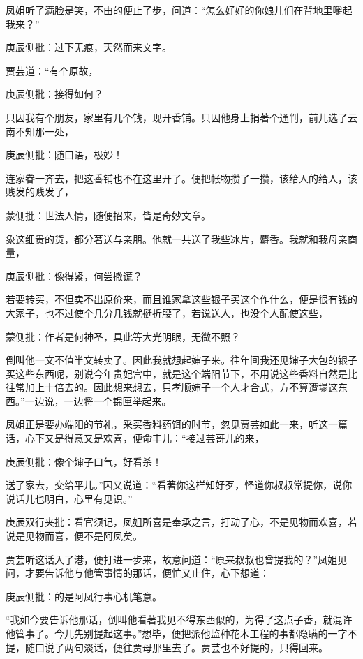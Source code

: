 \begin{parag}


    凤姐听了满脸是笑，不由的便止了步，问道：“怎么好好的你娘儿们在背地里嚼起我来？”\begin{note}庚辰侧批：过下无痕，天然而来文字。\end{note}贾芸道：“有个原故，\begin{note}庚辰侧批：接得如何？\end{note}只因我有个朋友，家里有几个钱，现开香铺。只因他身上捐著个通判，前儿选了云南不知那一处，\begin{note}庚辰侧批：随口语，极妙！\end{note}连家眷一齐去，把这香铺也不在这里开了。便把帐物攒了一攒，该给人的给人，该贱发的贱发了，\begin{note}蒙侧批：世法人情，随便招来，皆是奇妙文章。\end{note}象这细贵的货，都分著送与亲朋。他就一共送了我些冰片，麝香。我就和我母亲商量，\begin{note}庚辰侧批：像得紧，何尝撒谎？\end{note}若要转买，不但卖不出原价来，而且谁家拿这些银子买这个作什么，便是很有钱的大家子，也不过使个几分几钱就挺折腰了，若说送人，也没个人配使这些，\begin{note}蒙侧批：作者是何神圣，具此等大光明眼，无微不照？\end{note}倒叫他一文不值半文转卖了。因此我就想起婶子来。往年间我还见婶子大包的银子买这些东西呢，别说今年贵妃宫中，就是这个端阳节下，不用说这些香料自然是比往常加上十倍去的。因此想来想去，只孝顺婶子一个人才合式，方不算遭塌这东西。”一边说，一边将一个锦匣举起来。
\end{parag}


\begin{parag}


    凤姐正是要办端阳的节礼，采买香料药饵的时节，忽见贾芸如此一来，听这一篇话，心下又是得意又是欢喜，便命丰儿：“接过芸哥儿的来，\begin{note}庚辰侧批：像个婶子口气，好看杀！\end{note}送了家去，交给平儿。”因又说道：“看著你这样知好歹，怪道你叔叔常提你，说你说话儿也明白，心里有见识。”\begin{note}庚辰双行夹批：看官须记，凤姐所喜是奉承之言，打动了心，不是见物而欢喜，若说是见物而喜，便不是阿凤矣。\end{note}贾芸听这话入了港，便打进一步来，故意问道：“原来叔叔也曾提我的？”凤姐见问，才要告诉他与他管事情的那话，便忙又止住，心下想道：\begin{note}庚辰侧批：的是阿凤行事心机笔意。\end{note}“我如今要告诉他那话，倒叫他看著我见不得东西似的，为得了这点子香，就混许他管事了。今儿先别提起这事。”想毕，便把派他监种花木工程的事都隐瞒的一字不提，随口说了两句淡话，便往贾母那里去了。贾芸也不好提的，只得回来。
\end{parag}


